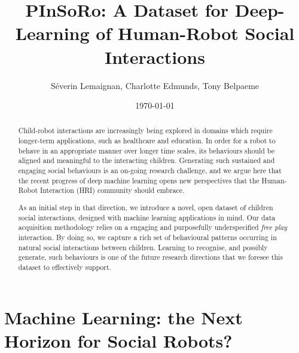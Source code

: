 \documentclass{article}
\title{PInSoRo: A Dataset for Deep-Learning of Human-Robot Social Interactions}
\author{Séverin Lemaignan, Charlotte Edmunds, Tony Belpaeme}
\date{\today}
\begin{document}
\maketitle

\begin{abstract}


Child-robot interactions are increasingly being explored in domains which
require longer-term applications, such as healthcare and education. In order
for a robot to behave in an appropriate manner over longer time scales, its
behaviours should be aligned and meaningful to the interacting children.
Generating such sustained and engaging social behaviours is an on-going research
challenge, and we argue here that the recent progress of deep machine learning
opens new perspectives that the Human-Robot Interaction (HRI) community
should embrace.

As an initial step in that direction, we introduce a novel,
open dataset of children social interactions, designed with
machine learning applications in mind. Our data acquisition methodology relies on
a engaging and purposefully underspecified \emph{free play} interaction. By doing
so, we capture a rich set of behavioural patterns occurring in natural
social interactions between children. Learning to recognise, and possibly generate, such
behaviours is one of the future research directions that we foresee this dataset to effectively support.


\end{abstract}

\section{Machine Learning: the Next Horizon for Social Robots?}
\end{document}
